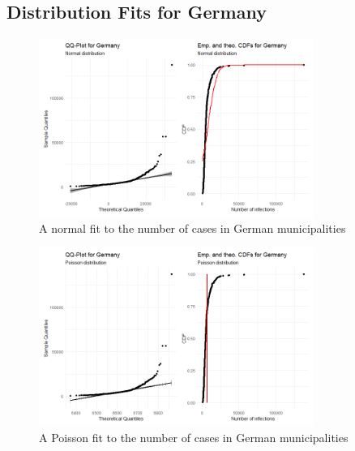\subsection{Distribution Fits for Germany}
%     
\begin{figure}[H]
    \centering
    \includegraphics[width = 0.8\textwidth]{fit_normal_germany.png}
    \caption{A normal fit to the number of cases in German municipalities}
    \label{fitNormalGermany}
\end{figure}
%     
\begin{figure}[H]
    \centering
    \includegraphics[width = 0.8\textwidth]{fit_poisson_germany.png}
    \caption{A Poisson fit to the number of cases in German municipalities}
    \label{fitPoissonGermany}
\end{figure}
